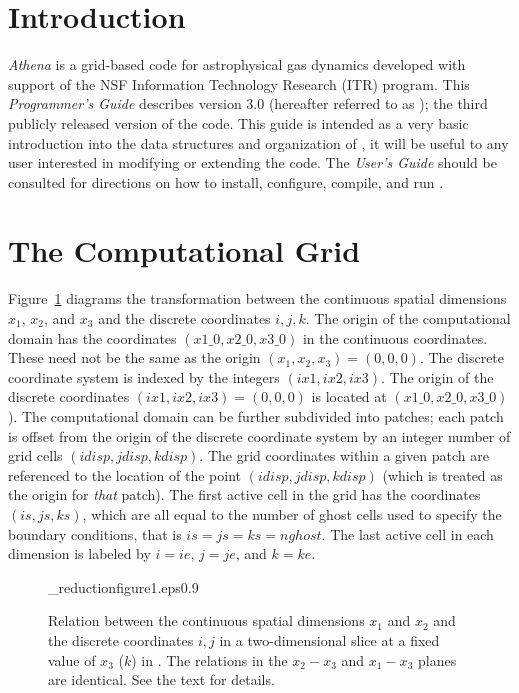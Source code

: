 \section{Introduction}

{\it Athena} is a grid-based code for astrophysical gas dynamics
developed with support of the NSF Information Technology Research (ITR)
program.  This {\it Programmer's Guide} describes version 3.0 (hereafter
referred to as \ath); the third publicly released version of the code.
This guide is intended as a very basic introduction into the data structures
and organization of \ath, it will be useful to any user interested in
modifying or extending the code.  The {\it User's Guide} should be consulted
for directions on how to install, configure, compile, and run \ath.

\section{The Computational Grid}

Figure~\ref{f:grid} diagrams the transformation between the continuous
spatial dimensions $x_{1}$, $x_{2}$, and $x_{3}$ and the discrete
coordinates $i,j,k$.  The origin of the computational domain has the
coordinates $(x1\_0, x2\_0, x3\_0)$ in the continuous coordinates.
These need not be the same as the origin $(x_{1},x_{2},x_{3}) = (0,0,0)$.
The discrete coordinate system is indexed by the integers $(ix1, ix2,
ix3)$.  The origin of the discrete coordinates $(ix1,ix2,ix3) = (0,0,0)$
is located at $(x1\_0,x2\_0,x3\_0)$).  The computational domain can be
further subdivided into patches; each patch is offset from the origin
of the discrete coordinate system by an integer number of grid cells
$(idisp, jdisp, kdisp)$.  The grid coordinates within a given patch
are referenced to the location of the point $(idisp, jdisp, kdisp)$
(which is treated as the origin for {\em that} patch).  The first active
cell in the grid has the coordinates $(is,js,ks)$, which are all equal
to the number of ghost cells used to specify the boundary conditions,
that is $is=js=ks=nghost$.  The last active cell in each dimension is
labeled by $i=ie$, $j=je$, and $k=ke$.

\begin{figure}[htb!]
\plotone_reduction{figure1.eps}{0.9}
\caption{Relation between the continuous spatial dimensions $x_{1}$ and $x_{2}$
and the discrete coordinates $i,j$ in a two-dimensional slice
at a fixed value of $x_{3}$ ($k$) in \ath.  The relations in the 
$x_{2}-x_{3}$ and $x_{1}-x_{3}$ planes are identical.
See the text for details.}
\label{f:grid}
\end{figure}

